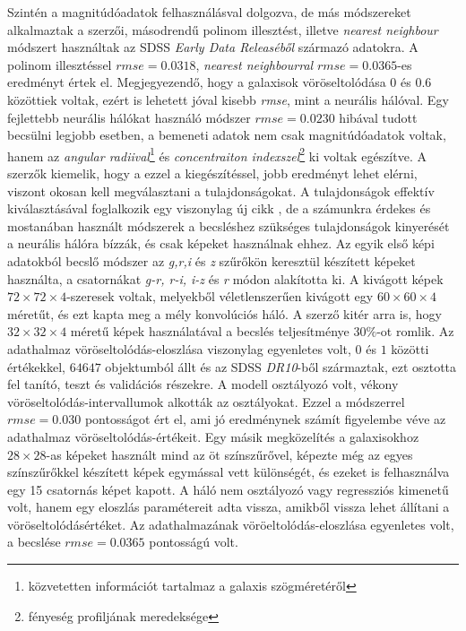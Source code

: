 \documentclass[12pt,letterpaper,oneside,openright]{book}
\begin{document}
 \newline\indent
 Szintén a magnitúdóadatok felhasználásval dolgozva, de más módszereket alkalmaztak a \cite{app_photoz} szerzői, másodrendű polinom illesztést, illetve \textit{nearest neighbour} módszert használtak az SDSS \textit{Early Data Releaséből} származó adatokra. A polinom illesztéssel $\textit{rmse} = 0.0318$, \textit{nearest neighbourral} $\textit{rmse} = 0.0365$-es eredményt értek el. Megjegyezendő, hogy a galaxisok vöröseltolódása $0$ és $0.6$ közöttiek voltak, ezért is lehetett jóval kisebb \textit{rmse}, mint a neurális hálóval.
 \newline \indent
 Egy fejlettebb neurális hálókat használó módszer \cite{mlrsone} $\textit{rmse} = 0.0230$ hibával tudott becsülni legjobb esetben, a bemeneti adatok nem csak magnitúdóadatok voltak, hanem az \textit{angular radiival}\footnote{közvetetten információt tartalmaz a galaxis szögméretéről} és \textit{concentraiton indexszel}\footnote{fényeség profiljának meredeksége} ki voltak egészítve. A szerzők kiemelik, hogy a ezzel a kiegészítéssel, jobb eredményt lehet elérni, viszont okosan kell megválasztani a tulajdonságokat. A tulajdonságok effektív kiválasztásával foglalkozik egy viszonylag új cikk \cite{fes}, de a számunkra érdekes és mostanában használt módszerek a becsléshez szükséges tulajdonságok kinyerését a neurális hálóra bízzák, és csak képeket használnak ehhez. 
 \newline \indent
 Az egyik első képi adatokból becslő módszer \cite{benh} az \textit{g,r,i} és \textit{z} szűrőkön keresztül készített képeket használta, a csatornákat \textit{g-r, r-i, i-z }és \textit{r} módon alakította ki. A kivágott képek $72\times 72\times 4$-szeresek voltak, melyekből véletlenszerűen kivágott egy $60\times 60 \times 4$ méretűt, és ezt kapta meg a mély konvolúciós háló. A szerző kitér arra is, hogy $32\times32\times 4$ méretű képek használatával a becslés teljesítménye $30\%$-ot romlik. Az adathalmaz vöröseltolódás-eloszlása viszonylag egyenletes volt, $0$ és $1$ közötti értékekkel, $\num{64647}$ objektumból állt és az SDSS \textit{DR10}-ből származtak, ezt osztotta fel tanító, teszt és validációs részekre. A modell osztályozó volt, vékony vöröseltolódás-intervallumok alkották az osztályokat. Ezzel a módszerrel  $\textit{rmse} = 0.030$ pontosságot ért el, ami jó eredménynek számít figyelembe véve az adathalmaz vöröseltolódás-értékeit.
 \newline\indent
 Egy másik megközelítés \cite{dast} a galaxisokhoz $28\times 28$-as képeket használt mind az öt színszűrővel, képezte még az egyes színszűrőkkel készített képek egymással vett különségét, és ezeket is felhasználva egy 15 csatornás képet kapott. A háló nem osztályozó vagy regressziós kimenetű volt, hanem egy eloszlás paramétereit adta vissza, amikből vissza lehet állítani a vöröseltolódásértéket. Az adathalmazának vöröeltolódás-eloszlása egyenletes volt, a becslése $\textit{rmse} =0.0365$ pontosságú volt. 
\end{document}
